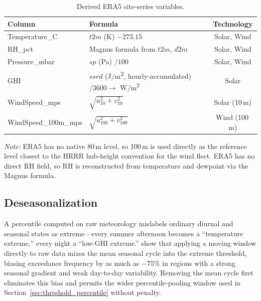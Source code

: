 \begin{table}[H]
\centering
\begin{threeparttable}
\caption{Derived ERA5 site-series variables.}
\label{tab:era5_derived_vars}
\begin{tabular}{llc}
\toprule
\textbf{Column} & \textbf{Formula} & \textbf{Technology} \\
\midrule
Temperature\_C       & $t2m$ (K) $- 273.15$                         & Solar, Wind \\
RH\_pct              & Magnus formula from $t2m$, $d2m$              & Solar, Wind \\
Pressure\_mbar       & $sp$ (Pa) $/ 100$                              & Solar, Wind \\
GHI                  & $ssrd$ (\si{J/m^2}, hourly-accumulated) $/ 3600 \rightarrow$ \si{W/m^2} & Solar \\
WindSpeed\_mps       & $\sqrt{u_{10}^2 + v_{10}^2}$                   & Solar (10\,m) \\
WindSpeed\_100m\_mps & $\sqrt{u_{100}^2 + v_{100}^2}$                 & Wind (100\,m) \\
\bottomrule
\end{tabular}
\begin{tablenotes}
\scriptsize
    \item \textit{Note:} ERA5 has no native 80\,m level, so 100\,m is used directly as the
    reference level closest to the HRRR hub-height convention for the wind fleet. ERA5 has no
    direct RH field, so RH is reconstructed from temperature and dewpoint via the Magnus formula.
\end{tablenotes}
\end{threeparttable}
\end{table}

\subsection{Deseasonalization}\label{sec:deseasonalization}

A percentile computed on raw meteorology mislabels ordinary diurnal and seasonal states as
extreme---every summer afternoon becomes a ``temperature extreme,'' every night a ``low-GHI
extreme.'' \citet{brunnervoigt2024} show that applying a moving window directly to raw data mixes
the mean seasonal cycle into the extreme threshold, biasing exceedance frequency by as much as
$-75\%$ in regions with a strong seasonal gradient and weak day-to-day variability. Removing the
mean cycle first eliminates this bias and permits the wider percentile-pooling window used in
Section~\ref{sec:threshold_percentile} without penalty.

